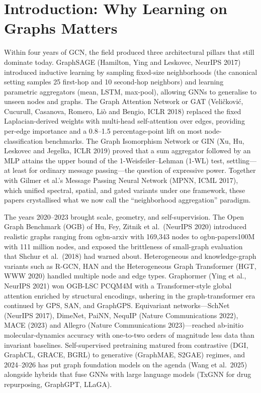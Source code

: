 \section{Introduction: Why Learning on Graphs Matters}\label{introduction-why-learning-on-graphs-matters}

Within four years of GCN, the field produced three architectural pillars that still dominate today. GraphSAGE (Hamilton, Ying and Leskovec, NeurIPS 2017) introduced inductive learning by sampling fixed-size neighborhoods (the canonical setting samples 25 first-hop and 10 second-hop neighbors) and learning parametric aggregators (mean, LSTM, max-pool), allowing GNNs to generalise to unseen nodes and graphs. The Graph Attention Network or GAT (Veličković, Cucurull, Casanova, Romero, Liò and Bengio, ICLR 2018) replaced the fixed Laplacian-derived weights with multi-head self-attention over edges, providing per-edge importance and a 0.8--1.5 percentage-point lift on most node-classification benchmarks. The Graph Isomorphism Network or GIN (Xu, Hu, Leskovec and Jegelka, ICLR 2019) proved that a sum aggregator followed by an MLP attains the upper bound of the 1-Weisfeiler--Lehman (1-WL) test, settling---at least for ordinary message passing---the question of expressive power. Together with Gilmer et al.'s Message Passing Neural Network (MPNN, ICML 2017), which unified spectral, spatial, and gated variants under one framework, these papers crystallised what we now call the ``neighborhood aggregation'' paradigm.

The years 2020--2023 brought scale, geometry, and self-supervision. The Open Graph Benchmark (OGB) of Hu, Fey, Zitnik et al.~(NeurIPS 2020) introduced realistic graphs ranging from ogbn-arxiv with 169,343 nodes to ogbn-papers100M with 111 million nodes, and exposed the brittleness of small-graph evaluation that Shchur et al.~(2018) had warned about. Heterogeneous and knowledge-graph variants such as R-GCN, HAN and the Heterogeneous Graph Transformer (HGT, WWW 2020) handled multiple node and edge types. Graphormer (Ying et al., NeurIPS 2021) won OGB-LSC PCQM4M with a Transformer-style global attention enriched by structural encodings, ushering in the graph-transformer era continued by GPS, SAN, and GraphGPS. Equivariant networks---SchNet (NeurIPS 2017), DimeNet, PaiNN, NequIP (Nature Communications 2022), MACE (2023) and Allegro (Nature Communications 2023)---reached ab-initio molecular-dynamics accuracy with one-to-two orders of magnitude less data than invariant baselines. Self-supervised pretraining matured from contrastive (DGI, GraphCL, GRACE, BGRL) to generative (GraphMAE, S2GAE) regimes, and 2024--2026 has put graph foundation models on the agenda (Wang et al.~2025) alongside hybrids that fuse GNNs with large language models (TxGNN for drug repurposing, GraphGPT, LLaGA).

